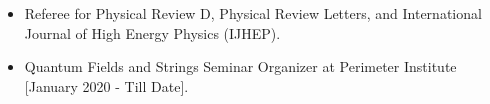 \begin{itemize}
  \item Referee for Physical Review D, Physical Review Letters, and International Journal of High Energy Physics (IJHEP).
  \item Quantum Fields and Strings Seminar Organizer at Perimeter Institute [January 2020 -  Till Date]. 
  \end{itemize}